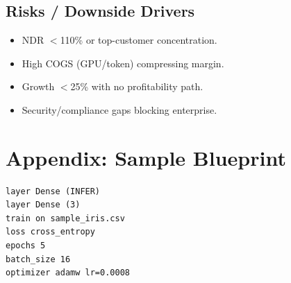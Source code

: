 \documentclass[11pt]{article}
\begin{document}
\subsection*{Risks / Downside Drivers}
\begin{itemize}
  \item NDR $<$110\% or top-customer concentration.
  \item High COGS (GPU/token) compressing margin.
  \item Growth $<$25\% with no profitability path.
  \item Security/compliance gaps blocking enterprise.
\end{itemize}

\section{Appendix: Sample Blueprint}
\begin{verbatim}
layer Dense (INFER)
layer Dense (3)
train on sample_iris.csv
loss cross_entropy
epochs 5
batch_size 16
optimizer adamw lr=0.0008
\end{verbatim}
\end{document}
